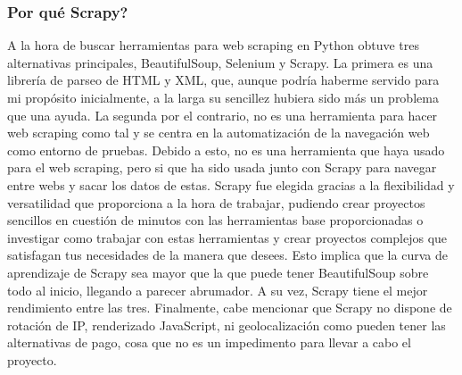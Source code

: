 \subsubsection{Por qué Scrapy?}
A la hora de buscar herramientas para web scraping en Python obtuve tres alternativas principales, BeautifulSoup, Selenium y Scrapy.
\newline
\newline
La primera es una librería de parseo de HTML y XML, que, aunque podría haberme servido para mi propósito inicialmente, a la larga su sencillez hubiera sido más un problema que una ayuda.
\newline
\newline
La segunda por el contrario, no es una herramienta para hacer web scraping como tal y se centra en la automatización de la navegación web como entorno de pruebas. Debido a esto, no es una herramienta que haya usado para el web scraping, pero si que ha sido usada junto con Scrapy para navegar entre webs 
y sacar los datos de estas.
\newline
\newline
Scrapy fue elegida gracias a la flexibilidad y versatilidad que proporciona a la hora de trabajar, pudiendo crear proyectos sencillos en cuestión de minutos con las herramientas base proporcionadas o investigar como trabajar con estas herramientas y crear proyectos complejos que satisfagan tus necesidades de la manera que desees. Esto implica que la curva de aprendizaje de Scrapy sea mayor que la que puede tener BeautifulSoup sobre todo al inicio, llegando a parecer abrumador. A su vez, Scrapy tiene el mejor rendimiento entre las tres.
\newline
\newline
Finalmente, cabe mencionar que Scrapy no dispone de rotación de IP, renderizado JavaScript, ni geolocalización como pueden tener las alternativas de pago, cosa que no es un impedimento para llevar a cabo el proyecto. 